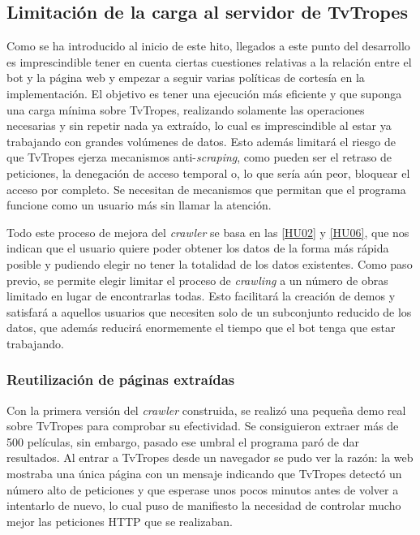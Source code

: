 \subsection{Limitación de la carga al servidor de TvTropes}
Como se ha introducido al inicio de este hito, llegados a este punto del
desarrollo es imprescindible tener en cuenta ciertas cuestiones relativas a la
relación entre el bot y la página web y empezar a seguir varias políticas de
cortesía en la implementación. El objetivo es tener una ejecución más eficiente
y que suponga una carga mínima sobre TvTropes, realizando solamente las
operaciones necesarias y sin repetir nada ya extraído, lo cual es imprescindible
al estar ya trabajando con grandes volúmenes de datos. Esto además limitará el
riesgo de que TvTropes ejerza mecanismos anti-\textit{scraping}, como pueden ser
el retraso de peticiones, la denegación de acceso temporal o, lo que sería aún
peor, bloquear el acceso por completo. Se necesitan de mecanismos que permitan
que el programa funcione como un usuario más sin llamar la atención.

Todo este proceso de mejora del \textit{crawler} se basa en las
\href{https://github.com/jlgallego99/TropesToGo/issues/7}{[HU02]} y
\href{https://github.com/jlgallego99/TropesToGo/issues/45}{[HU06]}, que nos
indican que el usuario quiere poder obtener los datos de la forma más rápida
posible y pudiendo elegir no tener la totalidad de los datos existentes. Como
paso previo, se permite elegir limitar el proceso de \textit{crawling} a un
número de obras limitado en lugar de encontrarlas todas. Esto facilitará la
creación de demos y satisfará a aquellos usuarios que necesiten solo de un
subconjunto reducido de los datos, que además reducirá enormemente el tiempo que
el bot tenga que estar trabajando.

\subsubsection{Reutilización de páginas extraídas}
Con la primera versión del \textit{crawler} construida, se realizó una pequeña
demo real sobre TvTropes para comprobar su efectividad. Se consiguieron extraer
más de 500 películas, sin embargo, pasado ese umbral el programa paró de dar
resultados. Al entrar a TvTropes desde un navegador se pudo ver la razón: la web
mostraba una única página con un mensaje indicando que TvTropes detectó un
número alto de peticiones y que esperase unos pocos minutos antes de volver a
intentarlo de nuevo, lo cual puso de manifiesto la necesidad de controlar mucho
mejor las peticiones HTTP que se realizaban.


